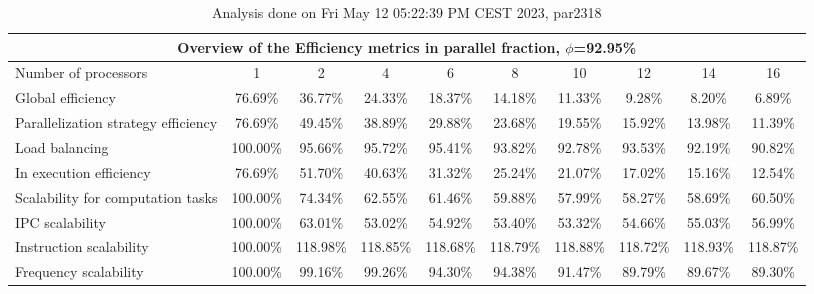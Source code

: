 \begin{table}[h]
\begin{center}
\begin{tabular}{|l|c|c|c|c|c|c|c|c|c|}
\hline
\multicolumn{10}{|c|}{Overview of the Efficiency metrics in parallel fraction, $\phi$=92.95\%} \\
\hline
\hline
Number of processors & 1 & 2 & 4 & 6 & 8 & 10 & 12 & 14 & 16 \\
\hline
\hline
Global efficiency                      &     76.69\% &     36.77\% &     24.33\% &     18.37\% &     14.18\% &     11.33\% &      9.28\% &      8.20\% &      6.89\% \\
\hline
\hline
Parallelization strategy efficiency &     76.69\% &     49.45\% &     38.89\% &     29.88\% &     23.68\% &     19.55\% &     15.92\% &     13.98\% &     11.39\% \\
\hline
Load balancing                   &    100.00\% &     95.66\% &     95.72\% &     95.41\% &     93.82\% &     92.78\% &     93.53\% &     92.19\% &     90.82\% \\
In execution efficiency          &     76.69\% &     51.70\% &     40.63\% &     31.32\% &     25.24\% &     21.07\% &     17.02\% &     15.16\% &     12.54\% \\
\hline
\hline
Scalability for computation tasks   &    100.00\% &     74.34\% &     62.55\% &     61.46\% &     59.88\% &     57.99\% &     58.27\% &     58.69\% &     60.50\% \\
\hline
IPC scalability                  &    100.00\% &     63.01\% &     53.02\% &     54.92\% &     53.40\% &     53.32\% &     54.66\% &     55.03\% &     56.99\% \\
Instruction scalability          &    100.00\% &    118.98\% &    118.85\% &    118.68\% &    118.79\% &    118.88\% &    118.72\% &    118.93\% &    118.87\% \\
Frequency scalability            &    100.00\% &     99.16\% &     99.26\% &     94.30\% &     94.38\% &     91.47\% &     89.79\% &     89.67\% &     89.30\% \\
\hline
\end{tabular}
\end{center}
\caption{ Analysis done on Fri May 12 05:22:39 PM CEST 2023, par2318}
\end{table}
